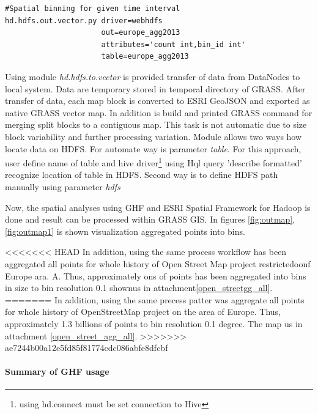 \documentclass[a4paper,12pt,oneside]{report}
\begin{document}
\begin{footnotesize}
	\begin{lstlisting}[style=python]
#Spatial binning for given time interval
hd.hdfs.out.vector.py driver=webhdfs
                      out=europe_agg2013 
                      attributes='count int,bin_id int' 
                      table=europe_agg2013
	\end{lstlisting}
\end{footnotesize}
	Using module \textit{hd.hdfs.to.vector} is provided transfer of data from DataNodes to local system. Data are temporary stored in temporal directory of GRASS. After transfer of data, each 
	map block is converted to ESRI GeoJSON and exported as native GRASS vector map. In addition is build and printed GRASS command for merging split blocks to a contiguous map. This task is not automatic due to size block variability  and further processing variation. Module allows two
	 ways how locate data on HDFS. For automate way is parameter \textit{table}. For this approach, user
	 define name of table and hive driver\footnote{using hd.connect must be set connection to Hive} using Hql query 'describe formatted' recognize location of table in HDFS.
	 Second way is to define HDFS path manually using parameter \textit{hdfs}
	
	Now, the spatial analyses using GHF and ESRI Spatial Framework for Hadoop is done and result can be processed within GRASS GIS. In figures \ref{fig:outmap}, \ref{fig:outmap1} is shown visualization aggregated points into bins.
	
<<<<<<< HEAD
	 In addition, using the same process workflow has been aggregated all points for whole history of Open Street Map project restrictedoonf Europe ara.  A. Thus, approximately ons  of points has been aggregated into bins in  size to bin  resolution 0.1 shownus in attachment\ref{open_streetgg_all}. 
=======
	 In addition, using the same precess patter was aggregate all points for whole history of OpenStreetMap project on the area of Europe. Thus, approximately 1.3 billions  of points  to bin  resolution 0.1 degree. The map us in attachment \ref{open_street_agg_all}. 
>>>>>>> ae7244b00a12e5fd85f81774cdc086abfe8dfcbf
	
	
	
	\paragraph{Summary of GHF usage}

		
		
\end{document}
